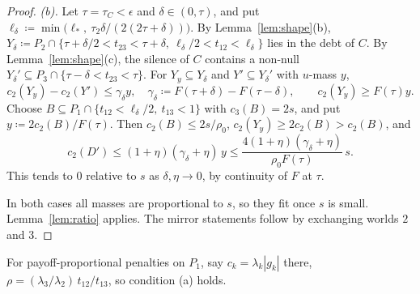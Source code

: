 \documentclass[11pt]{article}
\theoremstyle{definition}\newtheorem{definition}[theorem]{Definition}
\theoremstyle{remark}\newtheorem{remark}[theorem]{Remark}
\begin{document}
\begin{proof}
\emph{(b).} Let $\tau=\tau_C<\epsilon$ and $\delta\in(0,\tau)$, and put
$\ell_\delta\coloneqq\min\bigl(\ell_*,\ \tau_2\delta/(2(2\tau+\delta))\bigr)$.
By Lemma~\ref{lem:shape}(b),
$Y_\delta\coloneqq P_2\cap\{\tau+\delta/2<t_{23}<\tau+\delta,\ \ell_\delta/2<t_{12}<\ell_\delta\}$
lies in the debt of $C$. By Lemma~\ref{lem:shape}(c), the silence of $C$
contains a non-null $Y_\delta'\subseteq P_3\cap\{\tau-\delta<t_{23}<\tau\}$.
For $Y_y\subseteq Y_\delta$ and $Y'\subseteq Y_\delta'$ with $u$-mass $y$,
\[
 c_2(Y_y)-c_2(Y')\le\gamma_\delta y,\quad
 \gamma_\delta\coloneqq F(\tau+\delta)-F(\tau-\delta),\qquad
 c_2(Y_y)\ge F(\tau)y .
\]
Choose $B\subseteq P_1\cap\{t_{12}<\ell_\delta/2,\ t_{13}<1\}$ with
$c_3(B)=2s$, and put $y\coloneqq2c_2(B)/F(\tau)$. Then
$c_2(B)\le2s/\rho_0$, $c_2(Y_y)\ge2c_2(B)>c_2(B)$, and
\[
 c_2(D')\le(1+\eta)(\gamma_\delta+\eta)\,y
 \le\frac{4(1+\eta)(\gamma_\delta+\eta)}{\rho_0F(\tau)}\,s .
\]
This tends to $0$ relative to $s$ as $\delta,\eta\to0$, by continuity of $F$
at $\tau$.

In both cases all masses are proportional to $s$, so they fit once $s$ is
small. Lemma~\ref{lem:ratio} applies. The mirror statements follow by
exchanging worlds $2$ and $3$.
\end{proof}

For payoff-proportional penalties on $P_1$, say $c_k=\lambda_k|g_k|$ there,
$\rho=(\lambda_3/\lambda_2)\,t_{12}/t_{13}$, so condition (a) holds.
\end{document}
